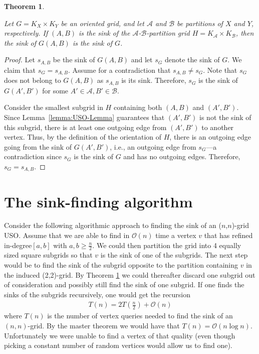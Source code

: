 \documentclass[a4paper,10pt]{article}
\newtheorem{theorem}{Theorem}
\newcommand{\indegree}{refined in-degree\xspace}
\newcommand{\A}{\ensuremath{\mathcal A}}
\newcommand{\B}{\ensuremath{\mathcal B}}
\newcommand{\s}[1]{\ensuremath{s_{\scriptscriptstyle#1}}}
\begin{document}
\begin{theorem}
\label{thm:the_sink_of_the_sink_of_the_induced_orientation_is_the_global_sink}

Let $G = K_X \times K_Y$ be an oriented grid,
and let $\A$ and $\B$ be partitions of $X$ and $Y$, respectively.
If $(A,B)$ is the sink of the $\A$-$\B$-partition grid $H = K_\A \times K_\B$, then the sink of $G(A,B)$ is the sink of $G$.
\end{theorem}
\begin{proof}
Let $\s{A,B}$ be the sink of $G(A,B)$ and let $\s{G}$ denote the sink of $G$.
We claim that $\s{G} = \s{A,B}$.
Assume for a contradiction that $\s{A,B}\neq \s{G}$.
Note that $\s{G}$ does not belong to $G(A,B)$ as $\s{A,B}$ is its sink.
Therefore, $\s{G}$ is the sink of $G(A', B')$ for some $A'\in \A, B'\in \B$.

Consider the smallest subgrid in $H$ containing both $(A,B)$ and $(A', B')$. 
Since Lemma~\ref{lemma:USO-Lemma} guarantees that $(A',B')$ is not the sink of this subgrid, there is at least one outgoing edge from $(A',B')$ to another vertex.
Thus, by the definition of the orientation of $H$, there is an outgoing edge going from the sink of $G(A',B')$, i.e., an outgoing edge from $\s{G}$---a contradiction since $\s{G}$ is the sink of $G$ and has no outgoing edges. 
Therefore, $\s{G} = \s{A,B}$.
\end{proof}



\section{The sink-finding algorithm}

Consider the following algorithmic approach to finding the sink of an ($n$,$n$)-grid USO. 
Assume that we are able to find in $\mathcal{O}(n)$ time a vertex $v$ that has \indegree $[a,b]$ with $a,b \geq \frac{n}{2}$.
We could then partition the grid into 4 equally sized square subgrids so that $v$ is the sink of one of the subgrids.
The next step would be to find the sink of the subgrid opposite to the partition containing $v$ in the induced (2,2)-grid. 
By Theorem \ref{thm:the_sink_of_the_sink_of_the_induced_orientation_is_the_global_sink} we could thereafter discard one subgrid out of consideration and possibly still find the sink of one subgrid. 
If one finds the sinks of the subgrids recursively, one would get the recursion
\begin{align*}
 T(n) = 2T\left(\frac{n}{2}\right) + \mathcal{O}(n)
\end{align*}
where $T(n)$ is the number of vertex queries needed to find the sink of an $(n,n)$-grid. By the master theorem we would have that $T(n) = \mathcal{O}(n\log n)$. Unfortunately we were unable to find a vertex of that quality (even though picking a constant number of random vertices would allow us to find one). 
\end{document}
